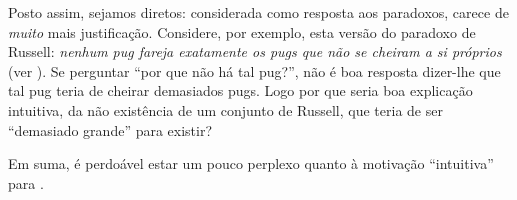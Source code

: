 \documentclass[../../../include/open-logic-section]{subfiles}
\begin{document}
Posto assim, sejamos diretos: considerada como resposta aos
paradoxos, \limofsize{} carece de \emph{muito} mais
justificação. Considere, por exemplo, esta versão do paradoxo de Russell: \emph{nenhum pug fareja exatamente os pugs que não se cheiram
a si próprios} (ver ). Se perguntar ``por que não há tal pug?'', não é boa resposta dizer-lhe que tal pug teria de cheirar demasiados
pugs. Logo por que seria boa explicação intuitiva, da
não existência de um conjunto de Russell, que teria de ser ``demasiado grande''
para existir? 

Em suma, é perdoável estar um pouco perplexo quanto à motivação ``intuitiva''
para \limofsize. 
\end{document}

